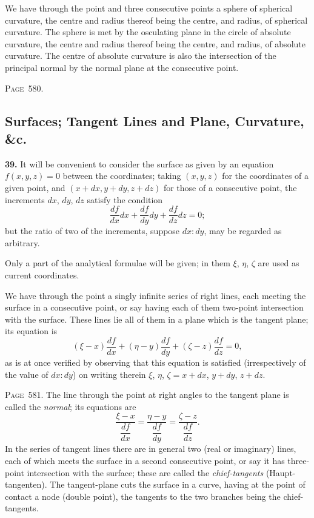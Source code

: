 \documentclass[11pt,a4paper]{book}
\begin{document}
We have through the point and three consecutive points a sphere of spherical curvature, the centre and radius thereof being the centre, and radius, of spherical curvature. The sphere is met by the osculating plane in the circle of absolute curvature, the centre and radius thereof being the centre, and radius, of absolute curvature. The centre of absolute curvature is also the intersection of the principal normal by the normal plane at the consecutive point.

\newpage
\noindent\textsc{Page~580.} \subsection*{Surfaces; Tangent Lines and Plane, Curvature, \&c.}

\textbf{39.} It will be convenient to consider the surface as given by an equation $f(x,y,z)=0$ between the coordinates; taking $(x,y,z)$ for the coordinates of a given point, and $(x+dx, y+dy, z+dz)$ for those of a consecutive point, the increments $dx$, $dy$, $dz$ satisfy the condition
\[
\frac{df}{dx}dx+\frac{df}{dy}dy+\frac{df}{dz}dz=0;
\]
but the ratio of two of the increments, suppose $dx:dy$, may be regarded as arbitrary.

Only a part of the analytical formulae will be given; in them $\xi$, $\eta$, $\zeta$ are used as current coordinates.

We have through the point a singly infinite series of right lines, each meeting the surface in a consecutive point, or say having each of them two-point intersection with the surface. These lines lie all of them in a plane which is the tangent plane; its equation is
\[
(\xi-x)\frac{df}{dx}+(\eta-y)\frac{df}{dy}+(\zeta-z)\frac{df}{dz}=0,
\]
as is at once verified by observing that this equation is satisfied (irrespectively of the value of $dx:dy$) on writing therein $\xi$, $\eta$, $\zeta=x+dx$, $y+dy$, $z+dz$.

\newpage
\noindent\textsc{Page~581.} The line through the point at right angles to the tangent plane is called the \textit{normal}; its equations are
\[
\frac{\xi-x}{\dfrac{df}{dx}}=\frac{\eta-y}{\dfrac{df}{dy}}=\frac{\zeta-z}{\dfrac{df}{dz}}.
\]
In the series of tangent lines there are in general two (real or imaginary) lines, each of which meets the surface in a second consecutive point, or say it has three-point intersection with the surface; these are called the \textit{chief-tangents} (Haupt-tangenten). The tangent-plane cuts the surface in a curve, having at the point of contact a node (double point), the tangents to the two branches being the chief-tangents.
\end{document}

